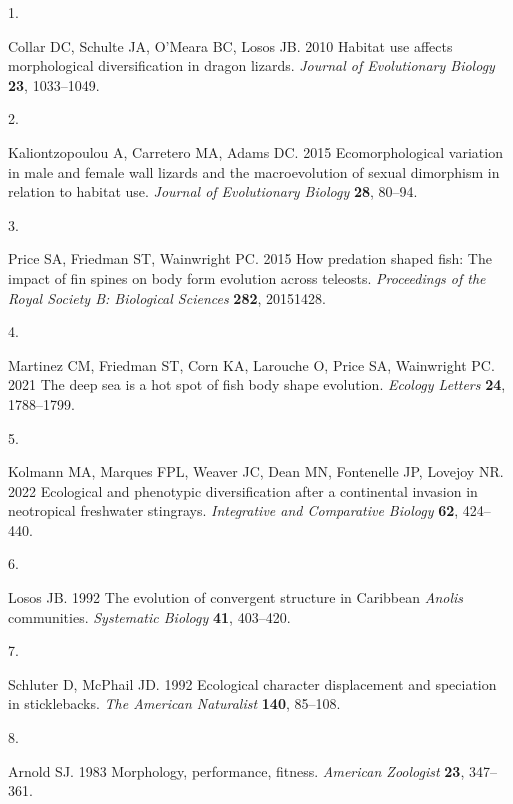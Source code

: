 \documentclass[
  11pt,
]{article}
\newlength{\cslhangindent}
\newlength{\csllabelwidth}
\newlength{\cslentryspacingunit} %
\newenvironment{CSLReferences}[2] %
 {%
  \setlength{\parindent}{0pt}
  \ifodd #1
  \let\oldpar\par
  \def\par{\hangindent=\cslhangindent\oldpar}
  \fi
  \setlength{\parskip}{#2\cslentryspacingunit}
 }%
 {}
\newcommand{\CSLLeftMargin}[1]{\parbox[t]{\csllabelwidth}{#1}}
\newcommand{\CSLRightInline}[1]{\parbox[t]{\linewidth - \csllabelwidth}{#1}\break}
\begin{document}
\setlength{\parindent}{-0.25in} \setlength{\leftskip}{0.25in}
\setlength{\parskip}{8pt} \noindent

\hypertarget{refs}{}
\begin{CSLReferences}{0}{0}
\leavevmode{}%
\CSLLeftMargin{1. }%
\CSLRightInline{Collar DC, Schulte JA, O'Meara BC, Losos JB. 2010
Habitat use affects morphological diversification in dragon lizards.
\emph{Journal of Evolutionary Biology} \textbf{23}, 1033--1049.}

\leavevmode{}%
\CSLLeftMargin{2. }%
\CSLRightInline{Kaliontzopoulou A, Carretero MA, Adams DC. 2015
Ecomorphological variation in male and female wall lizards and the
macroevolution of sexual dimorphism in relation to habitat use.
\emph{Journal of Evolutionary Biology} \textbf{28}, 80--94.}

\leavevmode{}%
\CSLLeftMargin{3. }%
\CSLRightInline{Price SA, Friedman ST, Wainwright PC. 2015 How predation
shaped fish: The impact of fin spines on body form evolution across
teleosts. \emph{Proceedings of the Royal Society B: Biological Sciences}
\textbf{282}, 20151428.}

\leavevmode{}%
\CSLLeftMargin{4. }%
\CSLRightInline{Martinez CM, Friedman ST, Corn KA, Larouche O, Price SA,
Wainwright PC. 2021 The deep sea is a hot spot of fish body shape
evolution. \emph{Ecology Letters} \textbf{24}, 1788--1799.}

\leavevmode{}%
\CSLLeftMargin{5. }%
\CSLRightInline{Kolmann MA, Marques FPL, Weaver JC, Dean MN, Fontenelle
JP, Lovejoy NR. 2022 Ecological and phenotypic diversification after a
continental invasion in neotropical freshwater stingrays.
\emph{Integrative and Comparative Biology} \textbf{62}, 424--440.}

\leavevmode{}%
\CSLLeftMargin{6. }%
\CSLRightInline{Losos JB. 1992 The evolution of convergent structure in
{C}aribbean \emph{{A}nolis} communities. \emph{Systematic Biology}
\textbf{41}, 403--420.}

\leavevmode{}%
\CSLLeftMargin{7. }%
\CSLRightInline{Schluter D, McPhail JD. 1992 Ecological character
displacement and speciation in sticklebacks. \emph{The American
Naturalist} \textbf{140}, 85--108.}

\leavevmode{}%
\CSLLeftMargin{8. }%
\CSLRightInline{Arnold SJ. 1983 Morphology, performance, fitness.
\emph{American Zoologist} \textbf{23}, 347--361.}


\end{CSLReferences}
\end{document}
